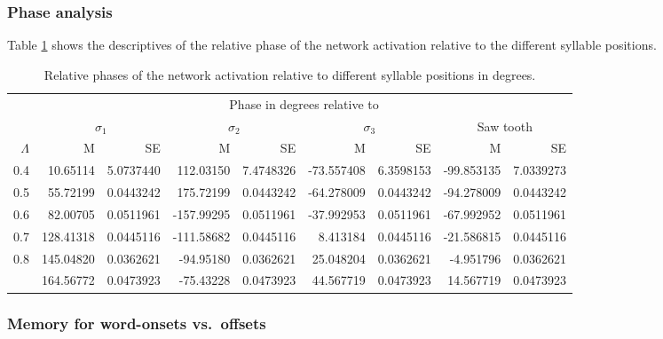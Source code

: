 \documentclass[
]{article}
\begin{document}
\hypertarget{phase-analysis-1}{%
\subsubsection{Phase analysis}\label{phase-analysis-1}}

Table \ref{tab:basic-experiment-global-phase-table2} shows the
descriptives of the relative phase of the network activation relative to
the different syllable positions.

\begin{table}

\caption{\label{tab:basic-experiment-global-phase-table2}Relative phases of the network activation relative to different syllable positions in degrees.}
\centering
\begin{tabular}[t]{rrrrrrrrr}
\toprule
\multicolumn{1}{c}{ } & \multicolumn{8}{c}{Phase in degrees relative to} \\
\cmidrule(l{3pt}r{3pt}){2-9}
\multicolumn{1}{c}{ } & \multicolumn{2}{c}{$\sigma_1$} & \multicolumn{2}{c}{$\sigma_2$} & \multicolumn{2}{c}{$\sigma_3$} & \multicolumn{2}{c}{Saw tooth} \\
\cmidrule(l{3pt}r{3pt}){2-3} \cmidrule(l{3pt}r{3pt}){4-5} \cmidrule(l{3pt}r{3pt}){6-7} \cmidrule(l{3pt}r{3pt}){8-9}
$\Lambda$ & M & SE & M & SE & M & SE & M & SE\\
\midrule
0.4 & 10.65114 & 5.0737440 & 112.03150 & 7.4748326 & -73.557408 & 6.3598153 & -99.853135 & 7.0339273\\
0.5 & 55.72199 & 0.0443242 & 175.72199 & 0.0443242 & -64.278009 & 0.0443242 & -94.278009 & 0.0443242\\
0.6 & 82.00705 & 0.0511961 & -157.99295 & 0.0511961 & -37.992953 & 0.0511961 & -67.992952 & 0.0511961\\
0.7 & 128.41318 & 0.0445116 & -111.58682 & 0.0445116 & 8.413184 & 0.0445116 & -21.586815 & 0.0445116\\
0.8 & 145.04820 & 0.0362621 & -94.95180 & 0.0362621 & 25.048204 & 0.0362621 & -4.951796 & 0.0362621\\
\addlinespace
0.9 & 164.56772 & 0.0473923 & -75.43228 & 0.0473923 & 44.567719 & 0.0473923 & 14.567719 & 0.0473923\\
\bottomrule
\end{tabular}
\end{table}

\clearpage

\hypertarget{memory-for-word-onsets-vs.-offsets}{%
\subsubsection{Memory for word-onsets
vs.~offsets}\label{memory-for-word-onsets-vs.-offsets}}
\end{document}

